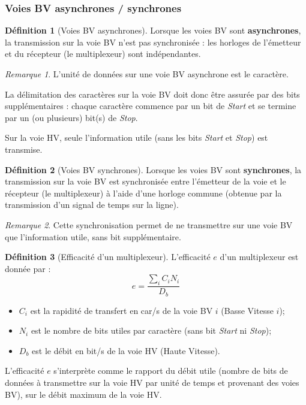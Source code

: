 \documentclass[11pt,english,french]{scrreprt}
\theoremstyle{remark}
\newtheorem*{rem*}{Remarque}
\theoremstyle{definition}
\newtheorem*{def*}{Définition}
\begin{document}
\subsubsection{Voies BV asynchrones / synchrones} %

\begin{def*}[Voies BV asynchrones]
	Lorsque les voies BV sont \textbf{asynchrones}, la transmission sur la voie BV n’est pas synchronisée : les horloges de l’émetteur et du récepteur (le multiplexeur) sont indépendantes. 
\end{def*}

\begin{rem*}
	L’unité de données sur une voie BV asynchrone est le caractère.
	
	La délimitation des caractères sur la voie BV doit donc être assurée par des bits supplémentaires : chaque caractère commence par un bit de \emph{Start} et se termine par un (ou plusieurs) bit(s) de \emph{Stop}. 
	
	Sur la voie HV, seule l’information utile (sans les bits \emph{Start} et \emph{Stop}) est transmise.
\end{rem*}

\begin{def*}[Voies BV synchrones]
	Lorsque les voies BV sont \textbf{synchrones}, la transmission sur la voie BV est synchronisée entre
	l’émetteur de la voie et le récepteur (le multiplexeur) à l’aide d’une horloge commune (obtenue par la transmission d’un signal de temps sur la ligne).
\end{def*}

\begin{rem*}
	Cette synchronisation permet de ne transmettre sur une voie BV que l’information utile, sans bit supplémentaire.
\end{rem*}

\begin{def*}[Efficacité d'un multiplexeur]
	L'efficacité $e$ d'un multiplexeur est donnée par :
	\[e=\frac{\sum_i C_i N_i}{D_b}\]
	\begin{itemize}
		\item $C_i$ est la rapidité de transfert en car/s de la voie BV $i$ (Basse Vitesse $i$);
		\item $N_i$ est le nombre de bits utiles par caractère (sans bit \emph{Start} ni \emph{Stop});
		\item $D_b$ est le débit en bit/s de la voie HV (Haute Vitesse).
	\end{itemize}
	
	L’efficacité $e$ s’interprète comme le rapport du débit utile (nombre de bits de données à transmettre sur la voie HV par unité de temps et provenant des voies BV), sur le débit maximum de la voie HV.	
\end{def*}
\end{document}
